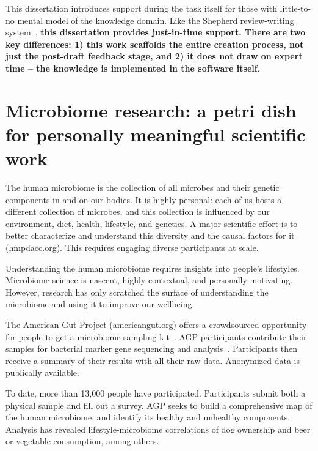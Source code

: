 This dissertation introduces support during the task itself for those with little-to-no mental model of the knowledge domain. 
Like the Shepherd review-writing system~\cite{dow2012shepherding}, \textbf {this dissertation provides just-in-time support. 
There are two key differences: 1) this work scaffolds the entire creation process, not just the post-draft feedback
 stage, and 2) it does not draw on expert time – the knowledge is implemented in the software itself}. 


\section{Microbiome research: a petri dish for personally meaningful scientific work}
The human microbiome is the collection of all microbes and
their genetic components in and on our bodies. It is highly
personal: each of us hosts a different collection of microbes,
and this collection is influenced by our environment, diet,
health, lifestyle, and genetics. A major scientific effort is to
better characterize and understand this diversity and the
causal factors for it (hmpdacc.org). This requires engaging
diverse participants at scale.

Understanding the human microbiome requires insights
into people’s lifestyles. Microbiome science is nascent, highly contextual, and personally motivating.
However, research has only scratched the surface of understanding the microbiome and using it 
to improve our wellbeing. 

The American Gut Project (americangut.org) offers a
crowdsourced opportunity for people to get a microbiome
sampling kit~\cite{KnightLab2016a}. AGP
participants contribute their samples for bacterial marker
gene sequencing and analysis~\cite{Debelius2016}. Participants then receive
a summary of their results with all their raw data. Anonymized data is publically available.

To date, more than 13,000 people have participated.
Participants submit both a physical sample and fill out
a survey. AGP seeks to build a comprehensive map of the human microbiome, and identify
its healthy and unhealthy components. Analysis has revealed lifestyle-microbiome correlations
of dog ownership and beer or vegetable consumption,
among others.

